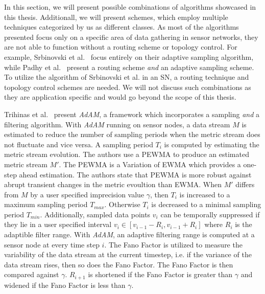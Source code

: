 In this section, we will present possible combinations of algorithms showcased
in this thesis. Additionall, we will present schemes, which employ multiple
techniques categorized by us as different classes. As most of the algorithms
presented focus only on a specific area of data gathering in sensor networks,
they are not able to function without a routing scheme or topology control. For
example, Srbinovski et al.~\cite{srbinovski2016energy} focus entirely on their
adaptive sampling algorithm, while Padhy et al.~\cite{padhy2006utility} present
a routing scheme \textit{and} an adaptive sampling scheme. To utilize the
algorithm of Srbinovski et al. in an \ac{SN}, a routing technique and topology
control schemes are needed. We will not discuss such combinations as they are
application specific and would go beyond the scope of this thesis.


Trihinas et al.~\cite{trihinas2015adam} present \textit{AdAM}, a framework
which incorporates a sampling \textit{and} a filtering algorithm. With
\textit{AdAM} running on sensor nodes, a data stream $ M $ is estimated to
reduce the number of sampling periods when the metric stream does not fluctuate
and vice versa. A sampling period $ T_i $ is computed by estimating the metric
stream evolution. The authors use a \ac{PEWMA} to produce an estimated metric
stream $ M' $. The \ac{PEWMA} is a Variation of \ac{EWMA} which provides a
one-step ahead estimation. The authors state that \ac{PEWMA} is more robust
against abrupt transient changes in the metric evoultion than \ac{EWMA}. When $
M' $ differs from $ M $ by a user specified imprecision value $
\gamma $, then $ T_i $ is increased to a maximum sampling period $ T_{max}
$. Otherwise $ T_i $ is decreased to a minimal sampling period $ T_{min} $.
Additionally, sampled data points $ v_{i} $ can be temporally suppressed if
they lie in a user specified interval $ v_i \in [v_{i-1} - R_i, v_{i-1} + R_i]
$ where $ R_i $ is the adaptible filter range. With \textit{AdAM}, an adaptive
filtering range is computed at a sensor node at every time step $ i $. The Fano
Factor is utilized to measure the variability of the data stream at the current
timestep, i.e. if the variance of the data stream rises, then so does the Fano
Factor. The Fano Factor is then compared against $ \gamma $. $ R_{i+1} $ is
shortened if the Fano Factor is greater than $ \gamma $ and widened if the Fano
Factor is less than $ \gamma $.

